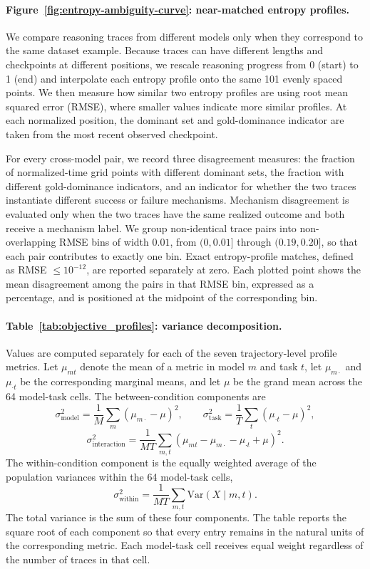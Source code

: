 \documentclass{article}
\begin{document}
\paragraph{Figure~\ref{fig:entropy-ambiguity-curve}: near-matched entropy profiles.}
We compare reasoning traces from different models only when they correspond to the same dataset example. Because traces can have different lengths and checkpoints at different positions, we rescale reasoning progress from 0 (start) to 1 (end) and interpolate each entropy profile onto the same 101 evenly spaced points. We then measure how similar two entropy profiles are using root mean squared error (RMSE), where smaller values indicate more similar profiles. At each normalized position, the dominant set and gold-dominance indicator are taken from the most recent observed checkpoint.

For every cross-model pair, we record three disagreement measures: the fraction of normalized-time grid points with different dominant sets, the fraction with different gold-dominance indicators, and an indicator for whether the two traces instantiate different success or failure mechanisms. Mechanism disagreement is evaluated only when the two traces have the same realized outcome and both receive a mechanism label. We group non-identical trace pairs into non-overlapping RMSE bins of width $0.01$, from $(0,0.01]$ through $(0.19,0.20]$, so that each pair contributes to exactly one bin. Exact entropy-profile matches, defined as RMSE $\leq 10^{-12}$, are reported separately at zero. Each plotted point shows the mean disagreement among the pairs in that RMSE bin, expressed as a percentage, and is positioned at the midpoint of the corresponding bin.

\paragraph{Table~\ref{tab:objective_profiles}: variance decomposition.}
Values are computed separately for each of the seven trajectory-level profile metrics. Let $\mu_{mt}$ denote the mean of a metric in model $m$ and task $t$, let $\mu_{m\cdot}$ and $\mu_{\cdot t}$ be the corresponding marginal means, and let $\mu$ be the grand mean across the 64 model-task cells. The between-condition components are
\[
\sigma^2_{\mathrm{model}}
= \frac{1}{M}\sum_m(\mu_{m\cdot}-\mu)^2,
\qquad
\sigma^2_{\mathrm{task}}
= \frac{1}{T}\sum_t(\mu_{\cdot t}-\mu)^2,
\]
\[
\sigma^2_{\mathrm{interaction}}
= \frac{1}{MT}\sum_{m,t}
(\mu_{mt}-\mu_{m\cdot}-\mu_{\cdot t}+\mu)^2.
\]
The within-condition component is the equally weighted average of the population variances within the 64 model-task cells,
\[
\sigma^2_{\mathrm{within}}
= \frac{1}{MT}\sum_{m,t}\mathrm{Var}(X\mid m,t).
\]
The total variance is the sum of these four components. The table reports the square root of each component so that every entry remains in the natural units of the corresponding metric. Each model-task cell receives equal weight regardless of the number of traces in that cell.
\end{document}

